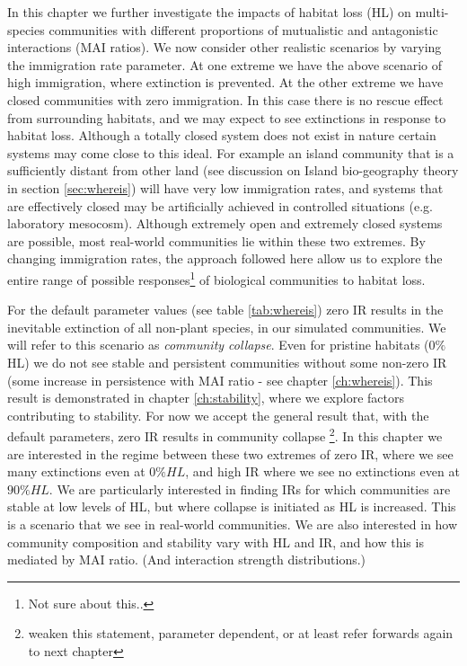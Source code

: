 \begin{itemize}
In this chapter we further investigate the impacts of habitat loss (HL)  on multi-species communities with different proportions of mutualistic and antagonistic interactions (MAI ratios). We now consider other realistic scenarios by varying the immigration rate parameter. At one extreme we have the above scenario of high immigration, where extinction is prevented. At the other extreme we have closed communities with zero immigration. In this case there is no rescue effect from surrounding habitats, and we may expect to see extinctions in response to habitat loss. Although a totally closed system does not exist in nature certain systems may come close to this ideal. For example an island community that is a sufficiently distant from other land (see discussion on Island bio-geography theory in section \ref{sec:whereis}) will have very low immigration rates, and systems that are effectively closed may be artificially achieved in controlled situations (e.g. laboratory mesocosm). Although extremely open and extremely closed systems are possible, most real-world communities lie within these two extremes. By changing immigration rates, the approach followed here allow us to explore the entire range of possible responses\footnote{Not sure about this..} of biological communities to habitat loss.

For the default parameter values (see table \ref{tab:whereis}) zero IR results in the inevitable extinction of all non-plant species, in our simulated communities. We will refer to this scenario as \emph{community collapse}. Even for pristine habitats ($0\%$ HL) we do not see stable and persistent communities without some non-zero IR (some increase in persistence with MAI ratio - see chapter \ref{ch:whereis}). This result is demonstrated in chapter \ref{ch:stability}, where we explore factors contributing to stability. For now we accept the general result that, with the default parameters, zero IR results in community collapse \footnote{weaken this statement, parameter dependent, or at least refer forwards again to next chapter}. In this chapter we are interested in the regime between these two extremes of zero IR, where we see many extinctions even at $0\% HL$, and high IR where we see no extinctions even at $90\% HL$. We are particularly interested in finding IRs for which communities are stable at low levels of HL, but where collapse is initiated as HL is increased. This is a scenario that we see in real-world communities. We are also interested in how community composition and stability vary with HL and IR, and how this is mediated by MAI ratio. (And interaction strength distributions.)


\end{itemize}
